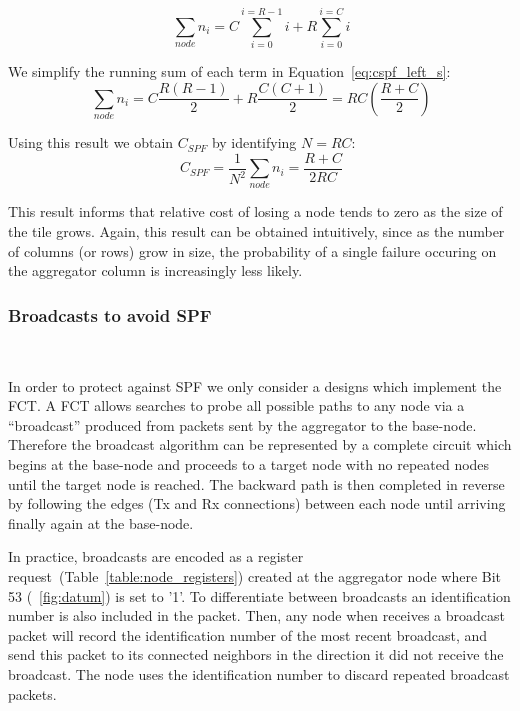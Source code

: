 \begin{equation}~\label{eq:cspf_left_s}
  \sum_{node}n_{i} = C\sum_{i=0}^{i=R-1}i + R\sum_{i=0}^{i=C}i
\end{equation}

We simplify the running sum of each term in Equation~\ref{eq:cspf_left_s}:
\begin{equation}~\label{eq:cspf_left_e}
  \sum_{node}n_{i} = C\frac{R(R-1)}{2} + R\frac{C(C+1)}{2} = RC(\frac{R+C}{2})
\end{equation}

Using this result we obtain $C_{SPF}$ by identifying $N = RC$:
\begin{equation}~\label{eq:cspf_left_fin}
  C_{SPF} = \frac{1}{N^{2}}\sum_{node}n_{i} = \boxed{\frac{R+C}{2RC}}
\end{equation}

This result informs that relative cost of losing a node tends to zero as the size of the tile grows.
Again, this result can be obtained intuitively, since as the number of columns (or rows) grow in size, the probability of a single failure occuring on the aggregator column is increasingly less likely.

\subsubsection{Broadcasts to avoid SPF}~\label{sec:broadcast}

In order to protect against SPF we only consider a designs which implement the FCT.
A FCT allows searches to probe all possible paths to any node via a ``broadcast'' produced from packets sent by the aggregator to the base-node.
Therefore the broadcast algorithm can be represented by a complete circuit which begins at the base-node and proceeds to a target node with no repeated nodes until the target node is reached.
The backward path is then completed in reverse by following the edges (Tx and Rx connections) between each node until arriving finally again at the base-node.

In practice, broadcasts are encoded as a register request~(Table~\ref{table:node_registers}) created at the aggregator node where Bit 53 (~\ref{fig:datum}) is set to '1'. 
To differentiate between broadcasts an identification number is also included in the packet.
Then, any node when receives a broadcast packet will record the identification number of the most recent broadcast, and send this packet to its connected neighbors in the direction it did not receive the broadcast.
The node uses the identification number to discard repeated broadcast packets.

